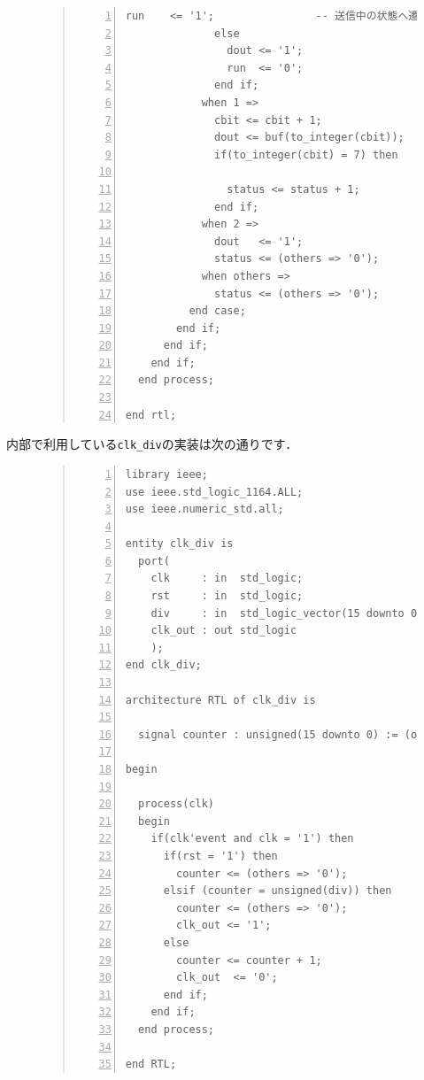 \documentclass[a4paper,dvipdfmx]{jsarticle}
\begin{document}
\begin{figure}[H]
\begin{quote}
\begin{Verbatim}[frame=single, numbers=left, baselinestretch=0.8]
                run    <= '1';                -- 送信中の状態へ遷移
              else                            --なにもしない状態へ遷移
                dout <= '1';
                run  <= '0';                  --送信要求受付可能状態へ
              end if;
            when 1 =>                         --データをLSBから順番に送信
              cbit <= cbit + 1;               -- カウンタをインクリメント
              dout <= buf(to_integer(cbit));  --一時バッファのcbit目を取出して出力
              if(to_integer(cbit) = 7) then   -- データの8ビット目を送信したら,
                                              -- ストップビットを送る状態へ遷移
                status <= status + 1;
              end if;
            when 2 =>                         -- ストップビットを送信
              dout   <= '1';                  --ストップビット1
              status <= (others => '0');      --初期状態へ
            when others =>                    --その他の状態の場合
              status <= (others => '0');      -- 初期状態へ遷移
          end case;
        end if;
      end if;
    end if;
  end process;

end rtl;
\end{Verbatim}
\end{quote}
\end{figure}

内部で利用している\verb|clk_div|の実装は次の通りです．
\begin{figure}[H]
\begin{quote}
\begin{Verbatim}[frame=single, numbers=left, baselinestretch=0.8]
library ieee;
use ieee.std_logic_1164.ALL;
use ieee.numeric_std.all;

entity clk_div is
  port(
    clk     : in  std_logic;
    rst     : in  std_logic;
    div     : in  std_logic_vector(15 downto 0);
    clk_out : out std_logic
    );
end clk_div;

architecture RTL of clk_div is

  signal counter : unsigned(15 downto 0) := (others => '0');

begin

  process(clk)
  begin
    if(clk'event and clk = '1') then
      if(rst = '1') then
        counter <= (others => '0');
      elsif (counter = unsigned(div)) then
        counter <= (others => '0');
        clk_out <= '1';
      else
        counter <= counter + 1;
        clk_out  <= '0';
      end if;
    end if; 
  end process;

end RTL;
\end{Verbatim}
\end{quote}
\end{figure}
\end{document}
